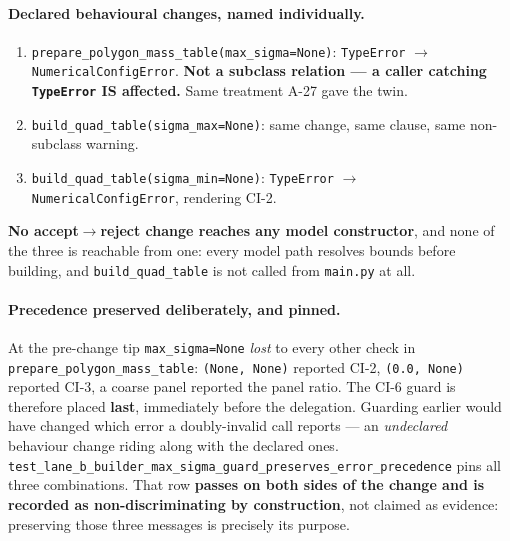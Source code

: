 \documentclass[
  10pt,
]{article}
\providecommand{\tightlist}{%
  \setlength{\itemsep}{0pt}\setlength{\parskip}{0pt}}
\begin{document}
\paragraph{Declared behavioural changes, named individually.}
\begin{enumerate}
\tightlist
\item \texttt{prepare\_polygon\_mass\_table(max\_sigma=None)}: \texttt{TypeError} $\rightarrow$ \texttt{NumericalConfigError}. \textbf{Not a subclass relation --- a caller catching \texttt{TypeError} IS affected.} Same treatment A-27 gave the twin.
\item \texttt{build\_quad\_table(sigma\_max=None)}: same change, same clause, same non-subclass warning.
\item \texttt{build\_quad\_table(sigma\_min=None)}: \texttt{TypeError} $\rightarrow$ \texttt{NumericalConfigError}, rendering CI-2.
\end{enumerate}
\textbf{No accept$\rightarrow$reject change reaches any model constructor}, and none of the three is reachable from one: every model path resolves bounds before building, and \texttt{build\_quad\_table} is not called from \texttt{main.py} at all.

\paragraph{Precedence preserved deliberately, and pinned.}
At the pre-change tip \texttt{max\_sigma=None} \emph{lost} to every other check in \texttt{prepare\_polygon\_mass\_table}: \texttt{(None, None)} reported CI-2, \texttt{(0.0, None)} reported CI-3, a coarse panel reported the panel ratio. The CI-6 guard is therefore placed \textbf{last}, immediately before the delegation. Guarding earlier would have changed which error a doubly-invalid call reports --- an \emph{undeclared} behaviour change riding along with the declared ones. \texttt{test\_lane\_b\_builder\_max\_sigma\_guard\_preserves\_error\_precedence} pins all three combinations. That row \textbf{passes on both sides of the change and is recorded as non-discriminating by construction}, not claimed as evidence: preserving those three messages is precisely its purpose.
\end{document}
